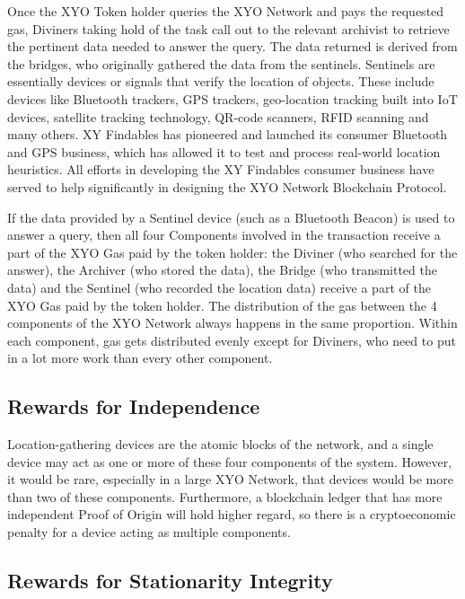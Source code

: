 \documentclass{article}
\begin{document}
Once the XYO Token holder queries the XYO Network and pays the requested gas, Diviners taking hold of the task call out to the relevant \Gls{archivist} to retrieve the pertinent data needed to answer the query. The data returned is derived from the \Glspl{bridge}, who originally gathered the data from the \Glspl{sentinel}. Sentinels are essentially devices or signals that verify the location of objects. These include devices like Bluetooth trackers, GPS trackers, geo-location tracking built into IoT devices, satellite tracking technology, QR-code scanners, RFID scanning and many others. XY Findables has pioneered and launched its consumer Bluetooth and GPS business, which has allowed it to test and process real-world location heuristics. All efforts in developing the XY Findables consumer business have served to help significantly in designing the XYO Network Blockchain Protocol.

If the data provided by a Sentinel device (such as a Bluetooth Beacon) is used to answer a query, then all four Components involved in the transaction receive a part of the XYO Gas paid by the token holder: the Diviner (who searched for the answer), the Archiver (who stored the data), the Bridge (who transmitted the data) and the Sentinel (who recorded the location data) receive a part of the XYO Gas paid by the token holder. The distribution of the gas between the 4 components of the XYO Network always happens in the same proportion. Within each component, gas gets distributed evenly except for Diviners, who need to put in a lot more work than every other component.

\subsection{Rewards for Independence}

Location-gathering devices are the atomic blocks of the network, and a single device may act as one or more of these four components of the system. However, it would be rare, especially in a large XYO Network, that devices would be more than two of these components. Furthermore, a blockchain ledger that has more independent Proof of Origin will hold higher regard, so there is a cryptoeconomic penalty for a device acting as multiple components.

\subsection{Rewards for Stationarity Integrity}
\end{document}
